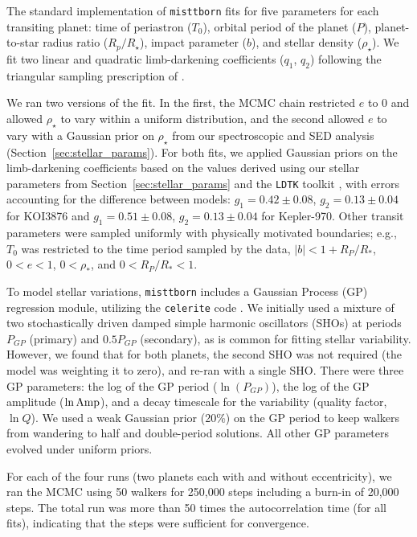 \documentclass[twocolumn, linenumbers]{aastex631}
\begin{document}
The standard implementation of \texttt{misttborn} fits for five parameters for each transiting planet: time of periastron ($T_0$), orbital period of the planet ($P$), planet-to-star radius ratio ($R_p/R_\star$), impact parameter ($b$), and stellar density ($\rho_\star$). We fit two linear and quadratic limb-darkening coefficients ($q_1$, $q_2$) following the triangular sampling prescription of \citet{Kipping2013}. 

We ran two versions of the fit. In the first, the MCMC chain restricted $e$ to 0 and allowed $\rho_\star$ to vary within a uniform distribution, and the second allowed $e$ to vary with a Gaussian prior on $\rho_\star$ from our spectroscopic and SED analysis (Section~\ref{sec:stellar_params}). For both fits, we applied Gaussian priors on the limb-darkening coefficients based on the values derived using our stellar parameters from Section~\ref{sec:stellar_params} and the \texttt{LDTK} toolkit \citep{2015MNRAS.453.3821P}, with errors accounting for the difference between models: $g_1=0.42\pm0.08$, $g_2=0.13\pm0.04$ for KOI3876 and $g_1=0.51\pm0.08$, $g_2=0.13\pm0.04$ for Kepler-970. Other transit parameters were sampled uniformly with physically motivated boundaries; e.g., $T_0$ was restricted to the time period sampled by the data, $|b|<1+R_P/R_*$, $0<e<1$, $0<\rho_*$, and $0<R_P/R_*<1$.

To model stellar variations, \texttt{misttborn} includes a Gaussian Process (GP) regression module, utilizing the \texttt{celerite} code \citep{celerite}. We initially used a mixture of two stochastically driven damped simple harmonic oscillators (SHOs) at periods $P_{GP}$ (primary) and $0.5P_{GP}$ (secondary), as is common for fitting stellar variability. However, we found that for both planets, the second SHO was not required (the model was weighting it to zero), and re-ran with a single SHO. There were three GP parameters: the log of the GP period ($\ln(P_{GP})$), the log of the GP amplitude ($\ln{\rm{Amp}}$), and a decay timescale for the variability (quality factor, $\ln{Q}$).  We used a weak Gaussian prior (20\%) on the GP period to keep walkers from wandering to half and double-period solutions. All other GP parameters evolved under uniform priors.

For each of the four runs (two planets each with and without eccentricity), we ran the MCMC using 50 walkers for 250,000 steps including a burn-in of 20,000 steps. The total run was more than 50 times the autocorrelation time (for all fits), indicating that the steps were sufficient for convergence. 
\end{document}
